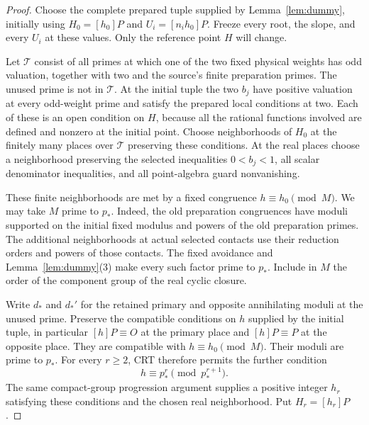 \documentclass[11pt,a4paper]{article}
\begin{document}
\begin{proof}
Choose the complete prepared tuple supplied by Lemma~\ref{lem:dummy},
initially using \(H_0=[h_0]P\) and \(U_i=[n_i h_0]P\).
Freeze every root, the slope, and every \(U_i\) at these values.
Only the reference point \(H\) will change.

Let \(\mathcal T\) consist of all primes at which one of the two
fixed physical weights has odd valuation, together with two and the
source's finite preparation primes. The unused prime is not in
\(\mathcal T\). At the initial tuple the two \(b_j\) have positive
valuation at every odd-weight prime and satisfy the prepared local
conditions at two. Each of these is an open condition on \(H\),
because all the rational functions involved are defined and nonzero
at the initial point. Choose neighborhoods of \(H_0\) at the finitely
many places over \(\mathcal T\) preserving these conditions.
At the real places choose a neighborhood preserving the selected
inequalities \(0<b_j<1\), all scalar denominator inequalities,
and all point-algebra guard nonvanishing.

These finite neighborhoods are met by a fixed congruence
\(h\equiv h_0\pmod M\). We may take \(M\) prime to \(p_*\).
Indeed, the old preparation congruences have moduli supported on the
initial fixed modulus and powers of the old preparation primes.
The additional neighborhoods at actual selected contacts use their
reduction orders and powers of those contacts. The fixed avoidance
and Lemma~\ref{lem:dummy}(3) make every such factor prime to
\(p_*\). Include in \(M\) the order of the component group of
the real cyclic closure.

Write \(d_*\) and \(d_*'\) for the retained primary and opposite
annihilating moduli at the unused prime. Preserve the compatible
conditions on \(h\) supplied by the initial tuple, in particular
\([h]P\equiv O\) at the primary place and
\([h]P\equiv P\) at the opposite place. They are compatible with
\(h\equiv h_0\pmod M\). Their moduli are prime to \(p_*\).
For every \(r\ge2\), CRT therefore permits the further condition
\[
                         h\equiv p_*^r\pmod{p_*^{r+1}}.
\]
The same compact-group progression argument supplies a positive
integer \(h_r\) satisfying these conditions and the chosen real
neighborhood. Put \(H_r=[h_r]P\).


\end{proof}
\end{document}
